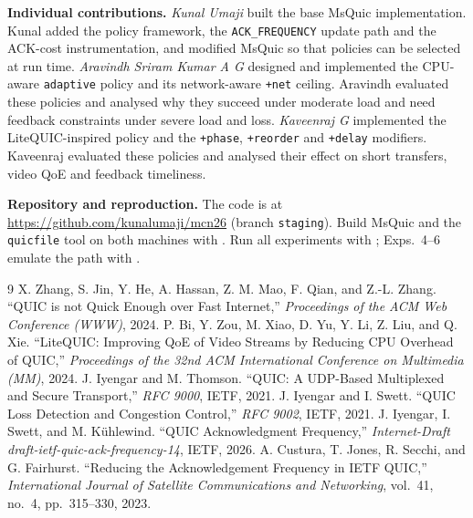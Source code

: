 \documentclass[11pt]{article}
\newcommand{\pol}[1]{\texttt{#1}}            %
\newcommand{\para}[1]{\textbf{#1}} %
\begin{document}
\para{Individual contributions.} \emph{Kunal Umaji} built the base MsQuic implementation. Kunal
added the policy framework, the \pol{ACK\_FREQUENCY} update path and the ACK-cost instrumentation,
and modified MsQuic so that policies can be selected at run time. \emph{Aravindh Sriram Kumar A G}
designed and implemented the CPU-aware \pol{adaptive} policy and its network-aware \pol{+net}
ceiling. Aravindh evaluated these policies and analysed why they succeed under moderate load and
need feedback constraints under severe load and loss. \emph{Kaveenraj G} implemented the
LiteQUIC-inspired policy and the \pol{+phase}, \pol{+reorder} and \pol{+delay} modifiers. Kaveenraj
evaluated these policies and analysed their effect on short transfers, video QoE and feedback
timeliness.

\para{Repository and reproduction.} The code is at \url{https://github.com/kunalumaji/mcn26}
(branch \pol{staging}). Build MsQuic and the \pol{quicfile} tool on both machines with
. Run all experiments with ; Exps.~4--6 emulate the path with
.

{\small
\begin{thebibliography}{9}
\setlength{\itemsep}{1pt}\setlength{\parsep}{0pt}
 X. Zhang, S. Jin, Y. He, A. Hassan, Z. M. Mao, F. Qian, and Z.-L. Zhang.
  ``QUIC is not Quick Enough over Fast Internet,'' \emph{Proceedings of the ACM Web Conference
  (WWW)}, 2024.
 P. Bi, Y. Zou, M. Xiao, D. Yu, Y. Li, Z. Liu, and Q. Xie. ``LiteQUIC:
  Improving QoE of Video Streams by Reducing CPU Overhead of QUIC,'' \emph{Proceedings of the 32nd
  ACM International Conference on Multimedia (MM)}, 2024.
 J. Iyengar and M. Thomson. ``QUIC: A UDP-Based Multiplexed and Secure
  Transport,'' \emph{RFC 9000}, IETF, 2021.
 J. Iyengar and I. Swett. ``QUIC Loss Detection and Congestion Control,''
  \emph{RFC 9002}, IETF, 2021.
 J. Iyengar, I. Swett, and M. K\"uhlewind. ``QUIC Acknowledgment Frequency,''
  \emph{Internet-Draft draft-ietf-quic-ack-frequency-14}, IETF, 2026.
 A. Custura, T. Jones, R. Secchi, and G. Fairhurst. ``Reducing the
  Acknowledgement Frequency in IETF QUIC,'' \emph{International Journal of Satellite Communications
  and Networking}, vol.~41, no.~4, pp.~315--330, 2023.
\end{thebibliography}
}
\end{document}
